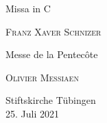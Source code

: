 \documentclass[a5paper,twoside=false,fontsize=11pt, DIV=14]{scrartcl}
\title{}
\author{}
\begin{document}
    \begin{titlepage}
        \begin{center}
            \vspace*{1.5cm}
            
            \begin{minipage}{\widthof{{\Huge Messe de la Pentecôte }}}
                {\Huge Missa in C}
                \bigskip
                
                \textsc{\LARGE Franz Xaver Schnizer}
                \vspace{1cm}
                
                {\Huge Messe de la Pentecôte}
                \bigskip
                
                \textsc{\LARGE Olivier Messiaen}
                
                \vspace*{4.2cm}
                
                \begin{center}
                {\Large Stiftskirche Tübingen\\[0.8ex] 25. Juli 2021}
                \vspace{2.5ex}
                \end{center}
                
            \end{minipage}
        \vfill
%                
            
%                
        \end{center}
    \end{titlepage}
\end{document}
